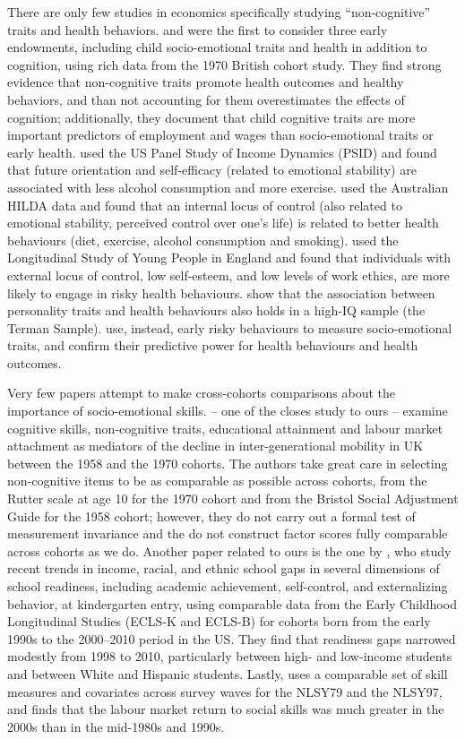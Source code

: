 There are only few studies in economics specifically studying ``non-cognitive'' traits and health behaviors. \citet{Conti2010a} and \citet{Conti2011} were the first to consider three early endowments, including child socio-emotional traits and health in addition to cognition, using rich data from the 1970 British cohort study. They find strong evidence that non-cognitive traits promote health outcomes and healthy behaviors, and than not accounting for them overestimates the effects of cognition; additionally, they document that child cognitive traits are more important predictors of employment and wages than socio-emotional traits or early health. \citet{Chiteji2010} used the US Panel Study of Income Dynamics (PSID) and found that future orientation and self-efficacy (related to emotional stability) are associated with less alcohol consumption and more exercise. \citet{Cobb-Clark2014} used the Australian HILDA data and found that an internal locus of control (also related to emotional stability, perceived control over one's life) is related to better health behaviours (diet, exercise, alcohol consumption and smoking). \citet{Mendolia2014a} used the Longitudinal Study of Young People in England and found that individuals with external locus of control, low self-esteem, and low levels of work ethics, are more likely to engage in risky health behaviours. \citet{Savelyev2017} show that the association between personality traits and health behaviours also holds in a high-IQ sample (the Terman Sample). \citet{Heckman2016a} use, instead, early risky behaviours to measure socio-emotional traits, and confirm their predictive power for health behaviours and health outcomes.

Very few papers attempt to make cross-cohorts comparisons about the importance of socio-emotional skills. \citet{Blanden2007} -- one of the closes study to ours -- examine cognitive skills, non‐cognitive traits, educational attainment and labour market attachment as mediators of the decline in inter-generational mobility in UK between the 1958 and the 1970 cohorts. The authors take great care in selecting non-cognitive items to be as comparable as possible across cohorts, from the Rutter scale at age 10 for the 1970 cohort and from the Bristol Social Adjustment Guide for the 1958 cohort; however, they do not carry out a formal test of measurement invariance and the do not construct factor scores fully comparable across cohorts as we do. Another paper related to ours is the one by \citet{Reardon2016}, who study recent trends in income, racial, and ethnic school gaps in several dimensions of school readiness, including academic achievement, self-control, and externalizing behavior, at
kindergarten entry, using comparable data from the Early Childhood Longitudinal Studies (ECLS-K and ECLS-B) for cohorts born from the
early 1990s to the 2000–2010 period in the US. They find that readiness gaps narrowed modestly from 1998 to 2010, particularly between high- and low-income students and between White and Hispanic students. Lastly, \citet{Deming2017} uses a comparable set of skill measures and covariates across survey waves for the NLSY79 and the NLSY97, and finds that the labour market return to social skills was much greater in the 2000s than in the mid-1980s and 1990s.

